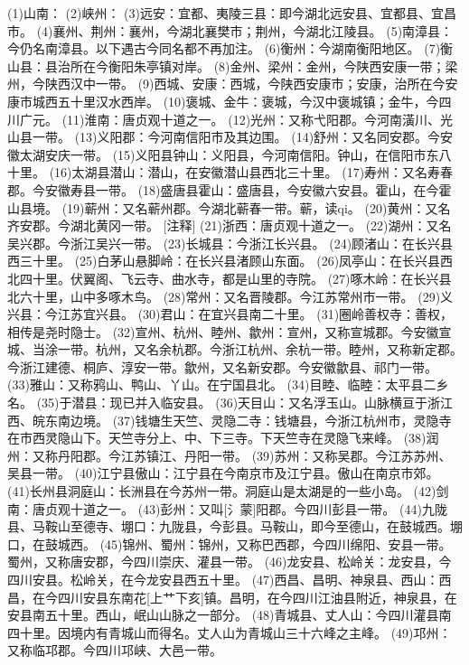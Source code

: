 \documentclass[12pt,UTF8]{ctexbook}
\begin{document}
(1)山南：
(2)峡州：
(3)远安：宜都、夷陵三县：即今湖北远安县、宜都县、宜昌市。
(4)襄州、荆州：襄州，今湖北襄樊市；荆州，今湖北江陵县。
(5)南漳县：今仍名南漳县。以下遇古今同名都不再加注。
(6)衡州：今湖南衡阳地区。
(7)衡山县：县治所在今衡阳朱亭镇对岸。
(8)金州、梁州：金州，今陕西安康一带；梁州，今陕西汉中一带。
(9)西城、安康：西城，今陕西安康市；安康，治所在今安康市城西五十里汉水西岸。
(10)褒城、金牛：褒城，今汉中褒城镇；金牛，今四川广元。
(11)淮南：唐贞观十道之一。
(12)光州：又称弋阳郡。今河南潢川、光山县一带。
(13)义阳郡：今河南信阳市及其边围。
(14)舒州：又名同安郡。今安徽太湖安庆一带。
(15)义阳县钟山：义阳县，今河南信阳。钟山，在信阳市东八十里。
(16)太湖县潜山：潜山，在安徽潜山县西北三十里。
(17)寿州：又名寿春郡。今安徽寿县一带。
(18)盛唐县霍山：盛唐县，今安徽六安县。霍山，在今霍山县境。
(19)蕲州：又名蕲州郡。今湖北蕲春一带。蕲，读qi。
(20)黄州：又名齐安郡。今湖北黄冈一带。
[注释]
(21)浙西：唐贞观十道之一。
(22)湖州：又名吴兴郡。今浙江吴兴一带。
(23)长城县：今浙江长兴县。
(24)顾渚山：在长兴县西三十里。
(25)白茅山悬脚岭：在长兴县渚顾山东面。
(26)凤亭山：在长兴县西北四十里。伏翼阁、飞云寺、曲水寺，都是山里的寺院。
(27)啄木岭：在长兴县北六十里，山中多啄木鸟。
(28)常州：又名晋陵郡。今江苏常州市一带。
(29)义兴县：今江苏宜兴县。
(30)君山：在宜兴县南二十里。
(31)圈岭善权寺：善权，相传是尧时隐士。
(32)宣州、杭州、睦州、歙州：宣州，又称宣城郡。今安徽宣城、当涂一带。杭州，又名余杭郡。今浙江杭州、余杭一带。睦州，又称新定郡。今浙江建德、桐庐、淳安一带。歙州，又名新安郡。今安徽歙县、祁门一带。
(33)雅山：又称鸦山、鸭山、丫山。在宁国县北。
(34)目睦、临睦：太平县二乡名。
(35)于潜县：现已并入临安县。
(36)天目山：又名浮玉山。山脉横亘于浙江西、皖东南边境。
(37)钱塘生天竺、灵隐二寺：钱塘县，今浙江杭州市，灵隐寺在市西灵隐山下。天竺寺分上、中、下三寺。下天竺寺在灵隐飞来峰。
(38)润州：又称丹阳郡。今江苏镇江、丹阳一带。
(39)苏州：又称吴郡。今江苏苏州、吴县一带。
(40)江宁县傲山：江宁县在今南京市及江宁县。傲山在南京市郊。
(41)长州县洞庭山：长洲县在今苏州一带。洞庭山是太湖是的一些小岛。
(42)剑南：唐贞观十道之一。
(43)彭州：又叫[氵蒙]阳郡。今四川彭县一带。
(44)九陇县、马鞍山至德寺、堋口：九陇县，今彭县。马鞍山，即今至德山，在鼓城西。堋口，在鼓城西。
(45)锦州、蜀州：锦州，又称巴西郡，今四川绵阳、安县一带。蜀州，又称唐安郡，今四川崇庆、灌县一带。
(46)龙安县、松岭关：龙安县，今四川安县。松岭关，在今龙安县西五十里。
(47)西昌、昌明、神泉县、西山：西昌，在今四川安县东南花[上艹下亥]镇。昌明，在今四川江油县附近，神泉县，在安县南五十里。西山，岷山山脉之一部分。 
(48)青城县、丈人山：今四川灌县南四十里。因境内有青城山而得名。丈人山为青城山三十六峰之主峰。
(49)邛州：又称临邛郡。今四川邛峡、大邑一带。
\end{document}
